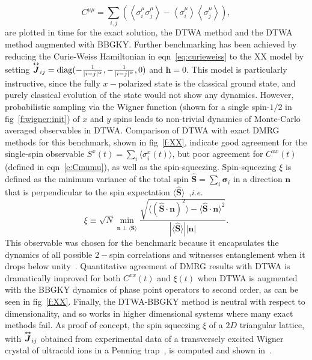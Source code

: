 \documentclass[extendedabs]{bmvc2k}
\DeclarePairedDelimiter{\diagfences}{(}{)}
\newcommand{\diag}{\operatorname{diag}\diagfences}
\begin{document}
\begin{equation}\label{e:Cmumu}
C^{\mu\mu}=\sum_{i,j}\left(\left\langle\sigma_i^\mu\sigma_j^\mu\right\rangle - \left\langle\sigma_i^\mu\right\rangle\left\langle\sigma_j^\mu\right\rangle\right),
\end{equation}
are plotted in time for the exact solution, the DTWA method and the DTWA method augmented with BBGKY.
Further benchmarking has been achieved by reducing the Curie-Weiss Hamiltonian in eqn~\ref{eq:curieweiss} to the XX model by setting 
$\overset{\text{\tiny$\bm\leftrightarrow$}}{\bm{J}}_{ij} =\diag{-\frac{1}{|i-j|^\alpha},-\frac{1}{|i-j|^\alpha},0}$ and $\bm{h} = 0$. This model is particularly instructive, since the fully $x-$polarized state is the classical ground state, and purely classical evolution of the state would not show any dynamics. However, probabilistic sampling via the Wigner function (shown for a single spin-$1/2$ in fig~\ref*{f:wigner:init}) of $x$ and $y$ spins leads to non-trivial dynamics of Monte-Carlo averaged observables in DTWA. Comparison of DTWA with exact DMRG methods for this benchmark, shown in fig~\ref{f:XX}, indicate good agreement for the single-spin observable $S^x(t) = \sum_i \langle \sigma^x_i(t)\rangle$, but poor agreement for $C^{xx}(t)$ (defined in eqn~\ref{e:Cmumu}), as well as the spin-squeezing. Spin-squeezing $\xi$ is defined as the minimum variance of the total spin $\hat{\bm{S}}=\sum_i\bm{\sigma}_i$ in a direction $\bm{n}$ that is perpendicular to the spin expectation $\langle\hat{\bm{S}}\rangle$~\cite{Sorensen01},\textit{i.e.}
\begin{equation}
\label{e:spinsqueezing}
	\xi \equiv \sqrt{N} \min_{\bm{n}\perp\langle\hat{\bm{S}}\rangle}{\frac{\sqrt{\langle
	(\hat{\bm{S}}\cdot\bm{n})^2\rangle-\langle\hat{\bm{S}}\cdot\bm{n}\rangle^2}}{|\langle\hat{\bm{S}}\rangle||\bm{n}|}}.
\end{equation}
This observable was chosen for the benchmark because it encapsulates the dynamics of all possible $2-$spin correlations and witnesses entanglement when it drops below unity~\cite{Sorensen01, Schachenmaye15}. Quantitative agreement of DMRG results with DTWA is dramatically improved for both $C^{xx}(t)$ and $\xi(t)$ when DTWA is augmented with the BBGKY dynamics of phase point operators to second order, as can be seen in fig~\ref{f:XX}. Finally, the DTWA-BBGKY method is neutral with respect to dimensionality, and so works in higher dimensional systems where many exact methods fail. As proof of concept, the spin squeezing $\xi$ of a $2D$ triangular lattice, with $\overset{\text{\tiny$\bm\leftrightarrow$}}{\bm{J}}_{ij}$ obtained from experimental data of a transversely excited  Wigner crystal of ultracold ions in a Penning trap~\cite{Britton12}, is computed and shown in~\cite{Pucci16}.
\end{document}
